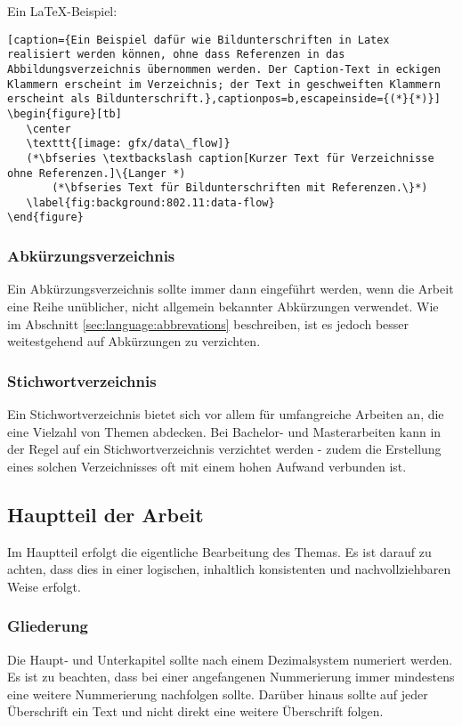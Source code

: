 Ein \LaTeX-Beispiel:
%
\begin{lstlisting}[caption={Ein Beispiel dafür wie Bildunterschriften in Latex realisiert werden können, ohne dass Referenzen in das Abbildungsverzeichnis übernommen werden. Der Caption-Text in eckigen Klammern erscheint im Verzeichnis; der Text in geschweiften Klammern erscheint als Bildunterschrift.},captionpos=b,escapeinside={(*}{*)}]
\begin{figure}[tb]
   \center
   \texttt{[image: gfx/data\_flow]}
   (*\bfseries \textbackslash caption[Kurzer Text für Verzeichnisse ohne Referenzen.]\{Langer *)
       (*\bfseries Text für Bildunterschriften mit Referenzen.\}*)
   \label{fig:background:802.11:data-flow}
\end{figure}
\end{lstlisting}

\subsubsection{Abkürzungsverzeichnis}\label{sec:structure:tables:abrev}
%
Ein Abkürzungsverzeichnis sollte immer dann eingeführt werden, wenn die Arbeit eine Reihe unüblicher, nicht allgemein bekannter Abkürzungen verwendet. Wie im Abschnitt \ref{sec:language:abbrevations} beschreiben, ist es jedoch besser weitestgehend auf Abkürzungen zu verzichten.

\subsubsection{Stichwortverzeichnis}\label{sec:structure:tables:index}
%
Ein Stichwortverzeichnis bietet sich vor allem für umfangreiche Arbeiten an, die eine Vielzahl von Themen abdecken. Bei Bachelor- und Masterarbeiten kann in der Regel auf ein Stichwortverzeichnis verzichtet werden - zudem die Erstellung eines solchen Verzeichnisses oft mit einem hohen Aufwand verbunden ist.

\subsection{Hauptteil der Arbeit}\label{sec:structure:main}
%
Im Hauptteil erfolgt die eigentliche Bearbeitung des Themas. Es ist darauf zu achten, dass dies in einer logischen, inhaltlich konsistenten und nachvollziehbaren Weise erfolgt.

\subsubsection{Gliederung}\label{sec:structure:main:structure}
%
Die Haupt‑ und Unterkapitel sollte nach einem Dezimalsystem numeriert werden. Es ist zu beachten, dass bei einer angefangenen Nummerierung immer mindestens eine weitere Nummerierung nachfolgen sollte. Darüber hinaus sollte auf jeder Überschrift ein Text  und nicht direkt eine weitere Überschrift folgen.

